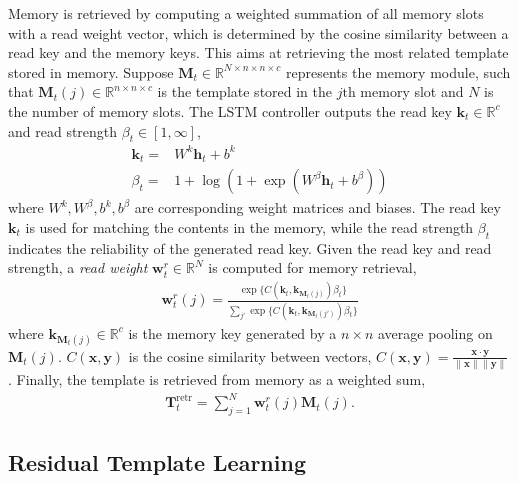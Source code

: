 \documentclass[runningheads]{llncs}
\begin{document}
Memory is retrieved by computing a weighted summation of all memory slots with a read weight vector, which is determined by the cosine similarity between a read key and the memory keys. This aims at retrieving the most related template stored in memory.
Suppose $\mathbf{M}_t \in \mathbb{R}^{N\times n \times n \times c}$ represents the memory module,  such that $\mathbf{M}_t(j) \in \mathbb{R}^{n \times n \times c}$ is the template stored in the $j\text{th}$ memory slot and $N$ is the number of memory slots. 
The LSTM controller outputs the read key $\mathbf{k}_t \in \mathbb{R}^{c}$ and read strength $\beta_t \in [1,\infty]$,
\begin{align}
\mathbf{k}_t = & W^k\mathbf{h}_{t}+b^k \\
\beta_t = & 1+\log(1+\exp(W^\beta \mathbf{h}_{t}+b^\beta))
\end{align}
where %
$W^k, W^\beta, b^k, b^\beta$ are corresponding weight matrices and biases.
The read key $\mathbf{k}_t$ is used for matching the contents in the memory, while the read strength $\beta_t$ indicates the reliability of the generated read key. 
Given the read key and read strength, a \textit{read weight} $\mathbf{w}^r_t\in \mathbb{R}^{N}$ is computed for memory retrieval,
\begin{align}
\mathbf{w}^r_t(j) =\frac{\exp{\{C(\mathbf{k}_t, \mathbf{k}_{\mathbf{M}_t(j)})}\beta_t\}}{\sum_{j'} \exp{\{C(\mathbf{k}_t, \mathbf{k}_{\mathbf{M}_t(j')})}\beta_t\}}
\end{align}
where $\mathbf{k}_{\mathbf{M}_t(j)} \in \mathbb{R}^{c}$ is the memory key generated by a $n\times n$ average pooling on $\mathbf{M}_t(j)$. $C(\mathbf{x}, \mathbf{y})$ is the  cosine similarity between vectors, 
$C(\mathbf{x},\mathbf{y})= \frac{\mathbf{x} \cdot \mathbf{y}}{\|\mathbf{x}\|\|\mathbf{y}\|}$.
Finally, the template is retrieved from memory as a weighted sum,
\begin{align}
\mathbf{T}^{\text{retr}}_t=\sum_{j=1}^N\mathbf{w}^r_t(j)\mathbf{M}_t(j).
\end{align}

\subsection{Residual Template Learning}
\end{document}
